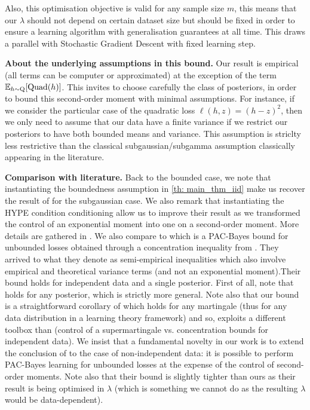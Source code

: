 Also, this optimisation objective is valid for any sample size $m$, this means that our $\lambda$ should not depend on certain dataset size but should be fixed in order to ensure a learning algorithm with generalisation guarantees at all time. This draws a parallel with Stochastic Gradient Descent with fixed learning step.


\textbf{About the underlying assumptions in this bound.} Our result  is empirical (all terms can be computer or approximated) at the exception of the term $\mathbb{E}_{h\sim \mathrm{Q}} [\mathrm{Quad}(h)]$. This invites to choose carefully the class of posteriors, in order to bound this second-order moment with minimal assumptions.
For instance, if we consider the particular case of the quadratic loss $\ell(h,z)= (h-z)^2$, then we only need to assume that our data have a finite variance if we restrict our posteriors to have both bounded means and variance. This assumption is striclty less restrictive than the classical subgaussian/subgamma assumption classically appearing in the literature.

\textbf{Comparison with literature.} Back to the bounded case, we note that instantiating the boundedness assumption in \cref{th: main_thm_iid} make us recover the result of \citet[][Theorem 4.1]{alquier2016properties} for the subgaussian case. We also remark that instantiating the HYPE condition conditioning \citet[][Theorem 3]{haddouche2021pac} allow us to improve their result as we transformed the control of an exponential moment into one on a second-order moment. More details are gathered in .
We also compare  to \citet[][Theorem 3]{kuzborskij2019efron} which is a PAC-Bayes bound for unbounded losses obtained through a concentration inequality from \citet{delapena2009self}. They arrived to what they denote as semi-empirical inequalities which also involve empirical and theoretical variance terms (and not an exponential moment).Their bound holds for independent data and a single posterior.
First of all, note that  holds for any posterior, which is strictly more general. Note also that our bound is a straightforward corollary of  which holds for any martingale (thus for any data distribution in a learning theory framework) and so, exploits a different toolbox than \citet{kuzborskij2019efron} (control of a supermartingale vs. concentration bounds for independent data). We insist that a fundamental novelty in our work is to extend the conclusion of \cite{kuzborskij2019efron} to the case of non-independent data: it is possible to perform PAC-Bayes learning for unbounded losses at the expense of the control of second-order moments.
Note also that their bound is slightly tighter than ours as their result is  being optimised in $\lambda$ (which is something we cannot do as the resulting $\lambda$ would be data-dependent).







